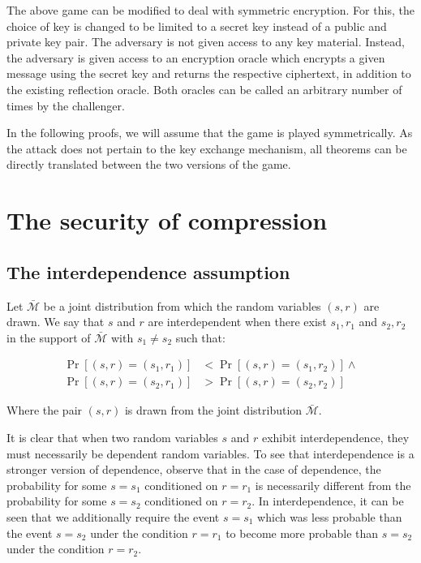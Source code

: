 \documentclass[conference, letterpaper, 10pt]{IEEEtran}
\begin{document}
 The above game can be modified to deal
with symmetric encryption. For this, the choice of key is changed to be limited
to a secret key instead of a public and private key pair. The adversary is not
given access to any key material.  Instead, the adversary is given access to an
encryption oracle which encrypts a given message using the secret key and
returns the respective ciphertext, in addition to the existing reflection
oracle. Both oracles can be called an arbitrary number of times by the
challenger.

In the following proofs, we will assume that the game is played symmetrically.
As the attack does not pertain to the key exchange mechanism, all theorems can
be directly translated between the two versions of the game.

\section{The security of compression}\label{sec:comsec}

\subsection{The interdependence assumption}\label{subsec:interdependence}

Let $\bar{\mathcal{M}}$ be a joint distribution from which the random variables
$(s, r)$ are drawn. We say that $s$ and $r$ are interdependent when there exist
$s_1, r_1$ and $s_2, r_2$ in the support of $\bar{\mathcal{M}}$ with $s_1 \neq
s_2$ such that:

\begin{align*}
    \Pr[(s, r) = (s_1, r_1)] &< \Pr[(s, r) = (s_1, r_2)]
\land\\
    \Pr[(s, r) = (s_2, r_1)] &> \Pr[(s, r) = (s_2, r_2)]
\end{align*}

Where the pair $(s, r)$ is drawn from the joint distribution
$\bar{\mathcal{M}}$.

It is clear that when two random variables $s$ and $r$ exhibit interdependence,
they must necessarily be dependent random variables. To see that
interdependence is a stronger version of dependence, observe that in the case
of dependence, the probability for some $s = s_1$ conditioned on $r = r_1$ is
necessarily different from the probability for some $s = s_2$ conditioned on $r
= r_2$. In interdependence, it can be seen that we additionally require the
event $s = s_1$ which was less probable than the event $s = s_2$ under the
condition $r = r_1$ to become more probable than $s = s_2$ under the condition
$r = r_2$.
\end{document}
